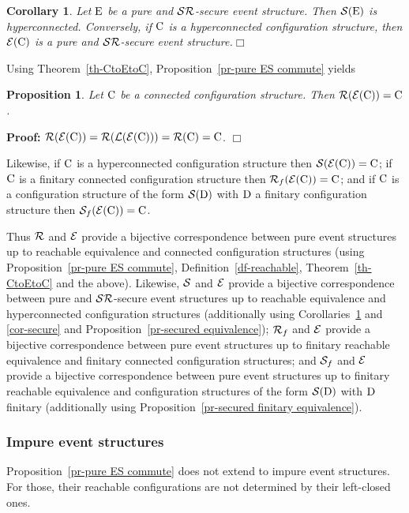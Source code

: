 \documentclass[twocolumn]{article}
\newtheorem{prop}{Proposition}[section]
\newtheorem{coro}{Corollary}
\newenvironment{proposition}[1]{\begin{prop} \rm \label{pr-#1} }{\end{prop}}
\newenvironment{corollary}[1]{\begin{coro} \rm \label{cor-#1} }{\end{coro}}
\newenvironment{proof}{\begin{trivlist} \item[\hspace{\labelsep}\bf
Proof:]}{\hfill $\Box$\end{trivlist}}
\newcommand{\df}[1]{Definition~\ref{df-#1}}
\newcommand{\thm}[1]{Theorem~\ref{th-#1}}
\newcommand{\pr}[1]{Proposition~\ref{pr-#1}}
\begin{document}
\begin{corollary}{hyperconnected}
Let ${\rm E}$ be a pure and ${\cal S}{\cal R}$-secure event structure.
Then ${\cal S}({\rm E})$ is hyperconnected.
Conversely, if ${\rm C}$ is a hyperconnected configuration structure, then ${\cal E}({\rm C})$ is a pure and
${\cal S}{\cal R}$-secure event structure.\hfill$\Box$
\end{corollary}
Using \thm{CtoEtoC}, \pr{pure ES commute} yields

\begin{proposition}{CtoE-reachable}
Let ${\rm C}$ be a connected configuration structure. Then
${\cal R}({\cal E}({\rm C}))={\rm C}$.
\end{proposition}
\begin{proof}
${\cal R}({\cal E}({\rm C}))={\cal R}({\cal L}({\cal E}({\rm C})))={\cal R}({\rm C})={\rm C}$.
\end{proof}
Likewise, if ${\rm C}$ is a hyperconnected configuration structure
then ${\cal S}({\cal E}({\rm C}))={\rm C}$; if ${\rm C}$ is a finitary connected
configuration structure then ${\cal R}_f({\cal E}({\rm C}))={\rm C}$; and if ${\rm C}$ is a
configuration structure of the form ${\cal S}({\rm D})$ with ${\rm D}$ a finitary
configuration structure then ${\cal S}_f({\cal E}({\rm C}))={\rm C}$.

Thus ${\cal R}$ and ${\cal E}$ provide a bijective correspondence between pure
event structures up to reachable equivalence and connected
configuration structures (using \pr{pure ES commute}, \df{reachable},
\thm{CtoEtoC} and the above).  Likewise, ${\cal S}$ and ${\cal E}$ provide a
bijective correspondence between pure and ${\cal S}{\cal R}$-secure event
structures up to reachable equivalence and hyperconnected configuration
structures (additionally using Corollaries~\ref{cor-hyperconnected}
and \ref{cor-secure} and \pr{secured equivalence});
${\cal R}_f$ and ${\cal E}$ provide a bijective correspondence between pure
event structures up to finitary reachable equivalence and finitary
connected configuration structures; and ${\cal S}_f$ and ${\cal E}$ provide a
bijective correspondence between pure event structures up to finitary
reachable equivalence and configuration structures of the form
${\cal S}({\rm D})$ with ${\rm D}$ finitary (additionally using \pr{secured
finitary equivalence}).

\subsubsection*{Impure event structures}

\pr{pure ES commute} does not extend to impure event structures. For those,
their reachable configurations are not determined by their left-closed ones.
\end{document}
